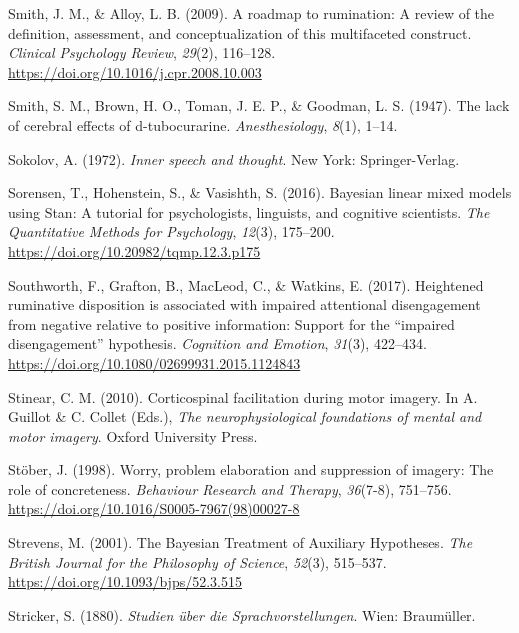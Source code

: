 \documentclass[a4paper,12pt,twoside,onecolumn,openright,final,oldfontcommands]{memoir}
\begin{document}
\leavevmode\hypertarget{ref-Smith2009}{}%
Smith, J. M., \& Alloy, L. B. (2009). A roadmap to rumination: A review of the definition, assessment, and conceptualization of this multifaceted construct. \emph{Clinical Psychology Review}, \emph{29}(2), 116--128. \url{https://doi.org/10.1016/j.cpr.2008.10.003}

\leavevmode\hypertarget{ref-smith_lack_1947}{}%
Smith, S. M., Brown, H. O., Toman, J. E. P., \& Goodman, L. S. (1947). The lack of cerebral effects of d-tubocurarine. \emph{Anesthesiology}, \emph{8}(1), 1--14.

\leavevmode\hypertarget{ref-sokolov_inner_1972}{}%
Sokolov, A. (1972). \emph{Inner speech and thought}. New York: Springer-Verlag.

\leavevmode\hypertarget{ref-sorensen_bayesian_2016}{}%
Sorensen, T., Hohenstein, S., \& Vasishth, S. (2016). Bayesian linear mixed models using Stan: A tutorial for psychologists, linguists, and cognitive scientists. \emph{The Quantitative Methods for Psychology}, \emph{12}(3), 175--200. \url{https://doi.org/10.20982/tqmp.12.3.p175}

\leavevmode\hypertarget{ref-southworth_heightened_2017}{}%
Southworth, F., Grafton, B., MacLeod, C., \& Watkins, E. (2017). Heightened ruminative disposition is associated with impaired attentional disengagement from negative relative to positive information: Support for the ``impaired disengagement'' hypothesis. \emph{Cognition and Emotion}, \emph{31}(3), 422--434. \url{https://doi.org/10.1080/02699931.2015.1124843}

\leavevmode\hypertarget{ref-stinear_corticospinal_2010}{}%
Stinear, C. M. (2010). Corticospinal facilitation during motor imagery. In A. Guillot \& C. Collet (Eds.), \emph{The neurophysiological foundations of mental and motor imagery}. Oxford University Press.

\leavevmode\hypertarget{ref-stober_worry_1998}{}%
Stöber, J. (1998). Worry, problem elaboration and suppression of imagery: The role of concreteness. \emph{Behaviour Research and Therapy}, \emph{36}(7-8), 751--756. \url{https://doi.org/10.1016/S0005-7967(98)00027-8}

\leavevmode\hypertarget{ref-strevens_bayesian_2001}{}%
Strevens, M. (2001). The Bayesian Treatment of Auxiliary Hypotheses. \emph{The British Journal for the Philosophy of Science}, \emph{52}(3), 515--537. \url{https://doi.org/10.1093/bjps/52.3.515}

\leavevmode\hypertarget{ref-stricker_studien_1880}{}%
Stricker, S. (1880). \emph{Studien über die Sprachvorstellungen}. Wien: Braumüller.
\end{document}
